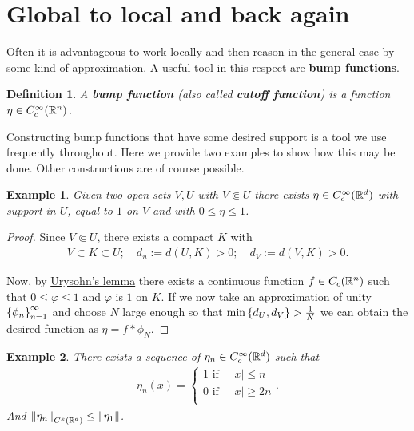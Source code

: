 \documentclass[12pt]{article}
\newtheorem{example}{Example}
\newtheorem{definition}{Definition}
\theoremstyle{remark}
\renewcommand{\norm}[1]{\left\lVert #1 \right\rVert}\renewcommand{\abs}[1]{\left| #1 \right|}
\begin{document}
\section{Global to local and back again}\label{local to global}
Often it is advantageous to work locally and then reason in the general case by some kind of approximation. A useful tool in this respect are \textbf{bump functions}.
\begin{definition}
	A \textbf{bump function} (also called \textbf{cutoff function}) is a function $\eta \in C_c^\infty(\mathbb{R}^n)$.
\end{definition}
Constructing bump functions that have some desired support is a tool we use frequently throughout. Here we provide two examples to show how this may be done. Other constructions are of course possible.
\begin{example}\label{bump example2}
	Given two open sets $V,U$ with  $V \Subset U$ there exists $\eta \in C_c^\infty(\mathbb{R}^d)$ with support in $U$, equal to  $1$ on  $V$ and with $0\leq \eta \leq 1$.
\end{example}
\begin{proof}
	Since $V \Subset U$, there exists a compact  $K$ with
	\begin{align*}
		V \subset K \subset U;\quad d_u:=d(U,K)>0; \quad d_V:=d(V,K)>0.
	\end{align*}

	Now, by \href{https://en.wikipedia.org/wiki/Urysohn%27s_lemma#:~:text=for%20any%20two-,non%2Dempty,-closed%20disjoint%20subsets}{Urysohn's lemma} there exists a continuous function  $f \in C_c(\mathbb{R}^n)$ such that $0\leq\varphi \leq 1$ and $\varphi$ is $1$ on  $K$.  If we now take an approximation of unity $\left\{\phi_n\right\}_{n=1}^\infty $  and choose $N$ large enough so that $\min \left\{d_U,d_V\right\} > \frac{1}{N}$ we can obtain the desired function as $ \eta=f*\phi_{N}$.
\end{proof}
\begin{example}
	There exists a sequence of $\eta_n \in C_c^\infty(\mathbb{R}^d)$ such  that
	\begin{align*}
		\eta_n(x) =\begin{cases}
			           1 \text{ if } & \abs{x}\leq n  \\
			           0 \text{ if } & \abs{x}\geq 2n \\
		           \end{cases}.
	\end{align*}
	And $\norm{\eta_n}_{C^k(\R^d)} \leq \norm{\eta_1} $.
\end{example}
\end{document}
